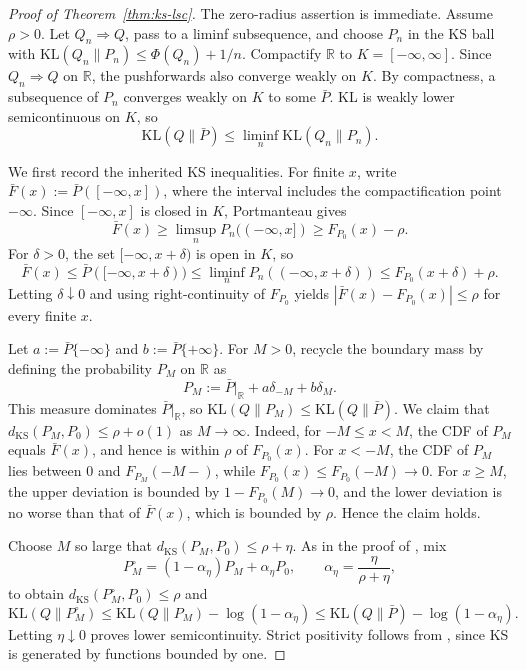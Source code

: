 \documentclass[11pt]{article}
\newcommand{\KS}{\mathrm{KS}}
\newcommand{\KL}{\mathrm{KL}}
\newcommand{\RR}{\mathbb{R}}
\theoremstyle{definition}
\theoremstyle{definition}
\begin{document}
\begin{proof}[Proof of Theorem~\ref{thm:ks-lsc}]
The zero-radius assertion is immediate.  Assume \(\rho>0\).  Let \(Q_n\Rightarrow Q\), pass to a liminf subsequence, and choose \(P_n\) in the KS ball with \(\KL(Q_n\|P_n)\le\Phi(Q_n)+1/n\).  Compactify \(\RR\) to \(K=[-\infty,\infty]\).  Since \(Q_n\Rightarrow Q\) on \(\RR\), the pushforwards also converge weakly on \(K\).  By compactness, a subsequence of \(P_n\) converges weakly on \(K\) to some \(\bar P\).  KL is weakly lower semicontinuous on \(K\), so
\[
  \KL(Q\|\bar P)\le\liminf_n\KL(Q_n\|P_n).
\]

We first record the inherited KS inequalities.  For finite \(x\), write \(\bar F(x):=\bar P([-\infty,x])\), where the interval includes the compactification point \(-\infty\).  Since \([-\infty,x]\) is closed in \(K\), Portmanteau gives
\[
  \bar F(x)\ge \limsup_n P_n((-
\infty,x])\ge F_{P_0}(x)-\rho.
\]
For \(\delta>0\), the set \([-\infty,x+\delta)\) is open in \(K\), so
\[
  \bar F(x)\le \bar P([-\infty,x+\delta))
  \le \liminf_n P_n((-
\infty,x+\delta))
  \le F_{P_0}(x+\delta)+\rho.
\]
Letting \(\delta\downarrow0\) and using right-continuity of \(F_{P_0}\) yields \(|\bar F(x)-F_{P_0}(x)|\le\rho\) for every finite \(x\).

Let \(a:=\bar P\{-\infty\}\) and \(b:=\bar P\{+\infty\}\).  For \(M>0\), recycle the boundary mass by defining the probability \(P_M\) on \(\RR\) as
\[
  P_M:=\bar P|_{\RR}+a\delta_{-M}+b\delta_M.
\]
This measure dominates \(\bar P|_{\RR}\), so \(\KL(Q\|P_M)\le\KL(Q\|\bar P)\).  We claim that \(d_{\KS}(P_M,P_0)\le\rho+o(1)\) as \(M\to\infty\).  Indeed, for \(-M\le x<M\), the CDF of \(P_M\) equals \(\bar F(x)\), and hence is within \(\rho\) of \(F_{P_0}(x)\).  For \(x<-M\), the CDF of \(P_M\) lies between \(0\) and \(F_{P_M}(-M-)\), while \(F_{P_0}(x)\le F_{P_0}(-M)\to0\).  For \(x\ge M\), the upper deviation is bounded by \(1-F_{P_0}(M)\to0\), and the lower deviation is no worse than that of \(\bar F(x)\), which is bounded by \(\rho\).  Hence the claim holds.

Choose \(M\) so large that \(d_{\KS}(P_M,P_0)\le\rho+\eta\).  As in the proof of , mix
\[
  P_M^\circ=(1-\alpha_\eta)P_M+\alpha_\eta P_0,
  \qquad \alpha_\eta=\frac{\eta}{\rho+\eta},
\]
to obtain \(d_{\KS}(P_M^\circ,P_0)\le\rho\) and
\[
  \KL(Q\|P_M^\circ)
  \le\KL(Q\|P_M)-\log(1-\alpha_\eta)
  \le\KL(Q\|\bar P)-\log(1-\alpha_\eta).
\]
Letting \(\eta\downarrow0\) proves lower semicontinuity.  Strict positivity follows from , since KS is generated by functions bounded by one.
\end{proof}
\end{document}
